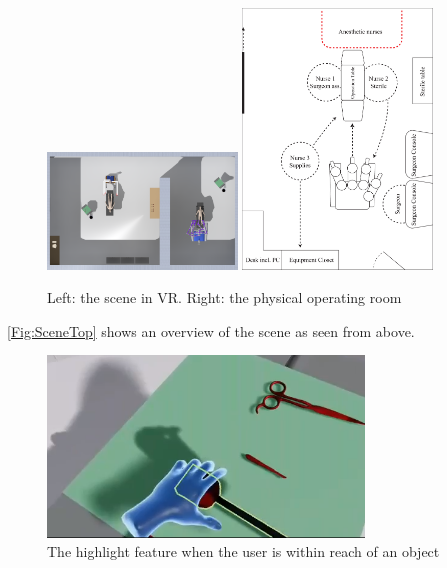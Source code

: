\begin{figure}
\includegraphics[width=0.45\textwidth]{FinishedSystem/SceneTop}
\includegraphics[width=0.45\textwidth]{FinishedSystem/physical}
\caption{Left: the scene in VR. Right: the physical operating room}
\label{Fig:SceneTop}
\end{figure}

\autoref{Fig:SceneTop} shows an overview of the scene as seen from above.

\begin{figure}
\includegraphics[width=0.75\textwidth]{FinishedSystem/grab}
\caption{The highlight feature when the user is within reach of an object}
\label{Fig:Grabering}
\end{figure}

